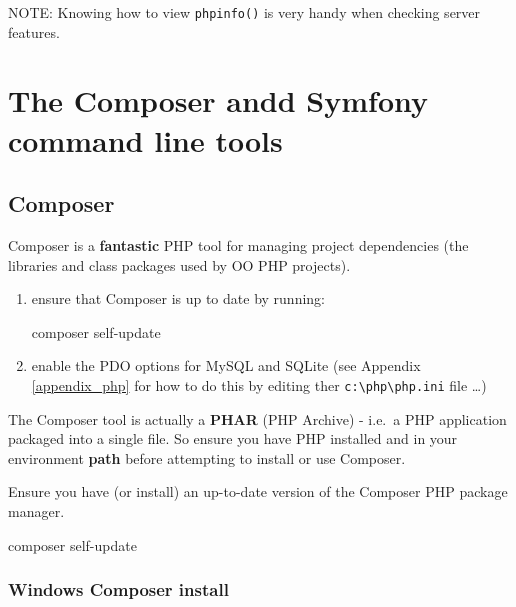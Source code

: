 \documentclass[a4paperpaper,openright]{book}
\newenvironment{Shaded}{}{}
\newcommand{\ExtensionTok}[1]{#1}
\newcommand{\NormalTok}[1]{#1}
\begin{document}
NOTE: Knowing how to view \texttt{phpinfo()} is very handy when checking
server features.

\hypertarget{the-composer-andd-symfony-command-line-tools}{%
\chapter{\texorpdfstring{The Composer andd Symfony command line
tools\label{cli_tools}}{The Composer andd Symfony command line tools}}\label{the-composer-andd-symfony-command-line-tools}}

\hypertarget{composer}{%
\section{Composer}\label{composer}}

Composer is a \textbf{fantastic} PHP tool for managing project
dependencies (the libraries and class packages used by OO PHP projects).

\begin{enumerate}
\def\labelenumi{\arabic{enumi}.}
\item
  ensure that Composer is up to date by running:

\begin{Shaded}
\begin{Highlighting}[]
    \ExtensionTok{composer}\NormalTok{ self-update}
\end{Highlighting}
\end{Shaded}
\item
  enable the PDO options for MySQL and SQLite (see Appendix
  \ref{appendix_php} for how to do this by editing ther
  \texttt{c:\textbackslash{}php\textbackslash{}php.ini} file \ldots{})
\end{enumerate}

The Composer tool is actually a \textbf{PHAR} (PHP Archive) - i.e.~a PHP
application packaged into a single file. So ensure you have PHP
installed and in your environment \textbf{path} before attempting to
install or use Composer.

Ensure you have (or install) an up-to-date version of the Composer PHP
package manager.

\begin{Shaded}
\begin{Highlighting}[]
    \ExtensionTok{composer}\NormalTok{ self-update}
\end{Highlighting}
\end{Shaded}

\hypertarget{windows-composer-install}{%
\subsection{Windows Composer install}\label{windows-composer-install}}
\end{document}
